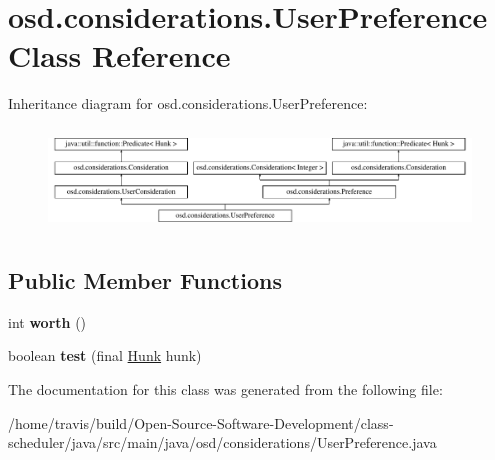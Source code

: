 \hypertarget{classosd_1_1considerations_1_1_user_preference}{\section{osd.\-considerations.\-User\-Preference Class Reference}
\label{classosd_1_1considerations_1_1_user_preference}
}
Inheritance diagram for osd.\-considerations.\-User\-Preference\-:\begin{figure}[H]
\begin{center}
\leavevmode
\includegraphics[height=2.755228cm]{classosd_1_1considerations_1_1_user_preference}
\end{center}
\end{figure}
\subsection*{Public Member Functions}
\begin{DoxyCompactItemize}
\item 
\hypertarget{classosd_1_1considerations_1_1_user_preference_a486463a2349d6884906a5cc6ccbfb570}{int {\bfseries worth} ()}\label{classosd_1_1considerations_1_1_user_preference_a486463a2349d6884906a5cc6ccbfb570}

\item 
\hypertarget{classosd_1_1considerations_1_1_user_preference_ad30f1b5c2001ed4f2b5719f8ae62121b}{boolean {\bfseries test} (final \hyperlink{classosd_1_1output_1_1_hunk}{Hunk} hunk)}\label{classosd_1_1considerations_1_1_user_preference_ad30f1b5c2001ed4f2b5719f8ae62121b}

\end{DoxyCompactItemize}


The documentation for this class was generated from the following file\-:\begin{DoxyCompactItemize}
\item 
/home/travis/build/\-Open-\/\-Source-\/\-Software-\/\-Development/class-\/scheduler/java/src/main/java/osd/considerations/User\-Preference.\-java\end{DoxyCompactItemize}
